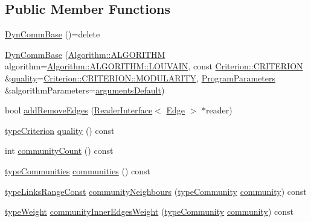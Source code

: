 \subsection*{Public Member Functions}
\begin{DoxyCompactItemize}
\item 
\hyperlink{classDynCommBase_a69682c03778e2f5d6b52c8139b26f454}{Dyn\+Comm\+Base} ()=delete
\item 
\hyperlink{classDynCommBase_a3dd8b3480d39f8be793d64a312b4da87}{Dyn\+Comm\+Base} (\hyperlink{classAlgorithm_a38e19a8c3dc51b97563a34d9e59a748d}{Algorithm\+::\+A\+L\+G\+O\+R\+I\+T\+HM} algorithm=\hyperlink{classAlgorithm_a38e19a8c3dc51b97563a34d9e59a748dab77e66715d6be972cdbf6cc4d990e732}{Algorithm\+::\+A\+L\+G\+O\+R\+I\+T\+H\+M\+::\+L\+O\+U\+V\+A\+IN}, const \hyperlink{classCriterion_a55594c223ce0837b8319c46c66cb648f}{Criterion\+::\+C\+R\+I\+T\+E\+R\+I\+ON} \&\hyperlink{classDynCommBase_a316b2c63a025810211d205ef6bf1d06c}{quality}=\hyperlink{classCriterion_a55594c223ce0837b8319c46c66cb648fa2a7d416fbe43baf234420601ea73d946}{Criterion\+::\+C\+R\+I\+T\+E\+R\+I\+O\+N\+::\+M\+O\+D\+U\+L\+A\+R\+I\+TY}, \hyperlink{structProgramParameters}{Program\+Parameters} \&algorithm\+Parameters=\hyperlink{program_8h_ae2d819404495f80f31db7676c1329d19}{arguments\+Default})
\item 
bool \hyperlink{classDynCommBase_a85ff9898ef25b12f3e80842c7b2696fe}{add\+Remove\+Edges} (\hyperlink{classReaderInterface}{Reader\+Interface}$<$ \hyperlink{classEdge}{Edge} $>$ $\ast$reader)
\item 
\hyperlink{criterionInterface_8h_af71ff22f6355fd69a4a62104bfd59a83}{type\+Criterion} \hyperlink{classDynCommBase_a316b2c63a025810211d205ef6bf1d06c}{quality} () const
\item 
int \hyperlink{classDynCommBase_add5d1d59a3f20b4ba039342b31551fb3}{community\+Count} () const
\item 
\hyperlink{graphUndirectedGroupable_8h_ab79c7252155ca17cb49aa0b1fea30116}{type\+Communities} \hyperlink{classDynCommBase_a064d9909a91cfe25acf05e6bd1fc967d}{communities} () const
\item 
\hyperlink{graphInterface_8h_ae8d27008f15586bbf419af7ad2e0a48a}{type\+Links\+Range\+Const} \hyperlink{classDynCommBase_aba6f1f0fdd67a1d7f546d63706a60cde}{community\+Neighbours} (\hyperlink{graphUndirectedGroupable_8h_a914da95c9ea7f14f4b7f875c36818556}{type\+Community} \hyperlink{classDynCommBase_a651753518a2de4ea52caea518e74d878}{community}) const
\item 
\hyperlink{edge_8h_a2e7ea3be891ac8b52f749ec73fee6dd2}{type\+Weight} \hyperlink{classDynCommBase_ada91e7e914eb8be7f8c25f4c0c81156a}{community\+Inner\+Edges\+Weight} (\hyperlink{graphUndirectedGroupable_8h_a914da95c9ea7f14f4b7f875c36818556}{type\+Community} \hyperlink{classDynCommBase_a651753518a2de4ea52caea518e74d878}{community}) const

\end{DoxyCompactItemize}
